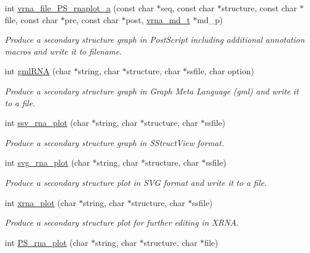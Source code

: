 \begin{DoxyCompactItemize}
int \hyperlink{group__plotting__utils_ga139a31dd0ba9fc6612431f67de901c31}{vrna\+\_\+file\+\_\+\+P\+S\+\_\+rnaplot\+\_\+a} (const char $\ast$seq, const char $\ast$structure, const char $\ast$file, const char $\ast$pre, const char $\ast$post, \hyperlink{group__model__details_ga1f8a10e12a0a1915f2a4eff0b28ea17c}{vrna\+\_\+md\+\_\+t} $\ast$md\+\_\+p)
\begin{DoxyCompactList}\small\item\em Produce a secondary structure graph in Post\+Script including additional annotation macros and write it to \textquotesingle{}filename\textquotesingle{}. \end{DoxyCompactList}\item 
int \hyperlink{group__plotting__utils_ga70834bc8c0aad4fe6824ff76ccb8f329}{gml\+R\+N\+A} (char $\ast$string, char $\ast$structure, char $\ast$ssfile, char option)
\begin{DoxyCompactList}\small\item\em Produce a secondary structure graph in Graph Meta Language (gml) and write it to a file. \end{DoxyCompactList}\item 
int \hyperlink{group__plotting__utils_gadd368528755f9a830727b680243541df}{ssv\+\_\+rna\+\_\+plot} (char $\ast$string, char $\ast$structure, char $\ast$ssfile)
\begin{DoxyCompactList}\small\item\em Produce a secondary structure graph in S\+Struct\+View format. \end{DoxyCompactList}\item 
int \hyperlink{group__plotting__utils_gae7853539b5df98f294b4af434e979304}{svg\+\_\+rna\+\_\+plot} (char $\ast$string, char $\ast$structure, char $\ast$ssfile)
\begin{DoxyCompactList}\small\item\em Produce a secondary structure plot in S\+V\+G format and write it to a file. \end{DoxyCompactList}\item 
int \hyperlink{group__plotting__utils_ga2f6d5953e6a323df898896b8d6614483}{xrna\+\_\+plot} (char $\ast$string, char $\ast$structure, char $\ast$ssfile)
\begin{DoxyCompactList}\small\item\em Produce a secondary structure plot for further editing in X\+R\+N\+A. \end{DoxyCompactList}\item 
int \hyperlink{group__plotting__utils_ga0873c7cc4cd7a11c9a2cea19dde7e9c9}{P\+S\+\_\+rna\+\_\+plot} (char $\ast$string, char $\ast$structure, char $\ast$file)

\end{DoxyCompactItemize}
